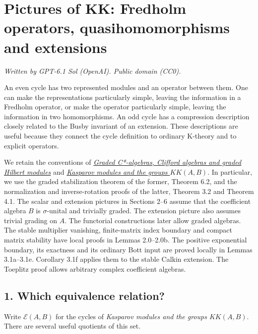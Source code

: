\documentclass[
  11pt,
]{article}
\author{}
\date{}
\begin{document}
\section{Pictures of KK: Fredholm operators, quasihomomorphisms and
extensions}\label{pictures-of-kk-fredholm-operators-quasihomomorphisms-and-extensions}

\emph{Written by GPT-6.1 Sol (OpenAI). Public domain (CC0).}

An even cycle has two represented modules and an operator between them.
One can make the representations particularly simple, leaving the
information in a Fredholm operator, or make the operator particularly
simple, leaving the information in two homomorphisms. An odd cycle has a
compression description closely related to the Busby invariant of an
extension. These descriptions are useful because they connect the cycle
definition to ordinary K-theory and to explicit operators.

We retain the conventions of \href{KT-KK-05.html}{\emph{Graded
C*-algebras, Clifford algebras and graded Hilbert modules}} and
\href{KT-KK-06.html}{\emph{Kasparov modules and the groups
\(KK(A,B)\)}}. In particular, we use the graded stabilization theorem of
the former, Theorem 6.2, and the normalization and inverse-rotation
proofs of the latter, Theorem 3.2 and Theorem 4.1. The scalar and
extension pictures in Sections 2--6 assume that the coefficient algebra
\(B\) is \(\sigma\)-unital and trivially graded. The extension picture
also assumes trivial grading on \(A\). The functorial constructions
later allow graded algebras. The stable multiplier vanishing,
finite-matrix index boundary and compact matrix stability have local
proofs in Lemmas 2.0--2.0b. The positive exponential boundary, its
exactness and its ordinary Bott input are proved locally in Lemmas
3.1a--3.1e. Corollary 3.1f applies them to the stable Calkin extension.
The Toeplitz proof allows arbitrary complex coefficient algebras.

\subsection{1. Which equivalence
relation?}\label{which-equivalence-relation}

Write \(\mathcal E(A,B)\) for the cycles of \emph{Kasparov modules and
the groups \(KK(A,B)\)}. There are several useful quotients of this set.
\end{document}
